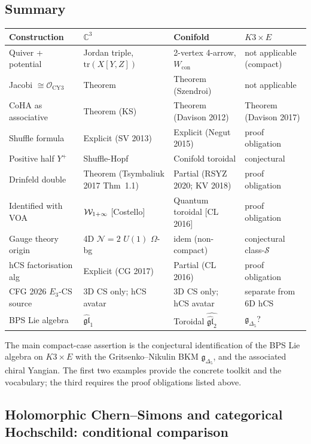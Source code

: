 \subsection{Summary}
\label{wn:subsec:coha-W-summary}

\begin{center}
\begin{tabular}{l|l|l|l}
\textbf{Construction} & \textbf{$\mathbb{C}^3$} & \textbf{Conifold} & \textbf{$K3 \times E$} \\\hline
Quiver + potential & Jordan triple, $\mathrm{tr}(X[Y,Z])$ & 2-vertex 4-arrow, $W_{\mathrm{con}}$ & not applicable (compact) \\
Jacobi $\cong \mathcal{O}_{\mathrm{CY3}}$ & Theorem & Theorem (Szendroi) & not applicable \\
CoHA as associative & Theorem (KS) & Theorem (Davison 2012) & Theorem (Davison 2017) \\
Shuffle formula & Explicit (SV 2013) & Explicit (Negut 2015) & proof obligation \\
Positive half $Y^+$ & Shuffle-Hopf & Conifold toroidal & conjectural \\
Drinfeld double & Theorem (Tsymbaliuk 2017 Thm~1.1) & Partial (RSYZ 2020; KV 2018) & proof obligation \\
Identified with VOA & $\mathcal{W}_{1+\infty}$ [Costello] & Quantum toroidal [CL 2016] & proof obligation \\
Gauge theory origin & 4D $\mathcal{N}=2$ $U(1)$ $\Omega$-bg & idem (non-compact) & conjectural class-$\mathcal{S}$ \\
hCS factorisation alg & Explicit (CG 2017) & Partial (CL 2016) & proof obligation \\
CFG 2026 $E_3$-CS source & 3D CS only; hCS avatar & 3D CS only; hCS avatar & separate from 6D hCS \\
BPS Lie algebra & $\widehat{\mathfrak{gl}}_1$ & Toroidal $\widehat{\widehat{\mathfrak{gl}}_2}$ & $\mathfrak{g}_{\Delta_5}$? \\
\end{tabular}
\end{center}

The main compact-case assertion is the conjectural identification of
the BPS Lie algebra on $K3 \times E$ with the Gritsenko--Nikulin BKM
$\mathfrak{g}_{\Delta_5}$, and the associated chiral Yangian.
The first two examples provide the concrete toolkit and the vocabulary; the third
requires the proof obligations listed above.

\subsection{Holomorphic Chern--Simons and categorical Hochschild: conditional comparison}
\label{subsec:hcs-vs-cat-hochschild}

